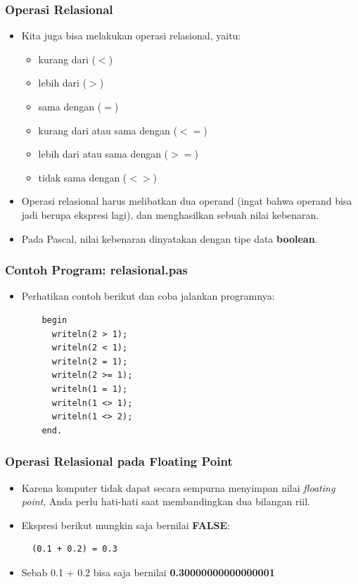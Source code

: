 \begin{frame}
\frametitle{Operasi Relasional}
\begin{itemize}
  \item Kita juga bisa melakukan operasi relasional, yaitu:
  \begin{itemize}
    \item kurang dari ($<$)
    \item lebih dari ($>$)
    \item sama dengan ($=$)
    \item kurang dari atau sama dengan ($<=$)
    \item lebih dari atau sama dengan ($>=$)
    \item tidak sama dengan ($<>$)
  \end{itemize}
  \item Operasi relasional harus melibatkan dua operand (ingat bahwa operand bisa jadi berupa ekspresi lagi), dan menghasilkan sebuah nilai kebenaran.
  \item Pada Pascal, nilai kebenaran dinyatakan dengan tipe data \alert{\textbf{boolean}}.
\end{itemize}
\end{frame}

\begin{frame}[fragile]
\frametitle{Contoh Program: relasional.pas}
\begin{itemize}
  \item Perhatikan contoh berikut dan coba jalankan programnya:
  \begin{lstlisting}
    begin
      writeln(2 > 1);
      writeln(2 < 1);
      writeln(2 = 1);
      writeln(2 >= 1);
      writeln(1 = 1);
      writeln(1 <> 1);
      writeln(1 <> 2);
    end.
  \end{lstlisting}
\end{itemize}
\end{frame}

\begin{frame}[fragile]
\frametitle{Operasi Relasional pada Floating Point}
\begin{itemize}
  \item Karena komputer tidak dapat secara sempurna menyimpan nilai \textit{floating point}, Anda perlu hati-hati saat membandingkan dua bilangan riil.
  \item Ekspresi berikut mungkin saja bernilai \textbf{FALSE}:
  \begin{lstlisting}
  (0.1 + 0.2) = 0.3
  \end{lstlisting}
  \item Sebab 0.1 + 0.2 bisa saja bernilai \textbf{0.30000000000000001}
\end{itemize}
\end{frame}

